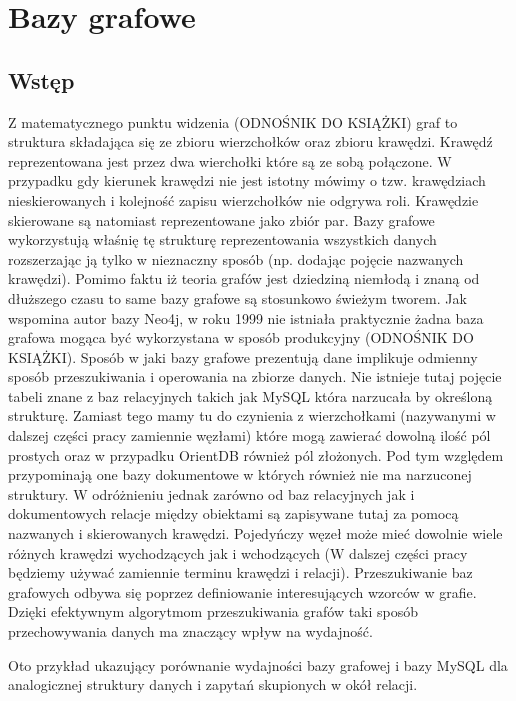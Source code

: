 \documentclass[brudnopis]{xmgr}
\begin{document}
\chapter{Bazy grafowe}

\section{Wstęp}

Z matematycznego punktu widzenia (ODNOŚNIK DO KSIĄŻKI) graf to struktura składająca się ze zbioru wierzchołków oraz zbioru krawędzi. Krawędź reprezentowana jest przez dwa wierchołki które są ze sobą połączone. W przypadku gdy kierunek krawędzi nie jest istotny mówimy o tzw. krawędziach nieskierowanych i kolejność zapisu wierzchołków nie odgrywa roli. Krawędzie skierowane są natomiast reprezentowane jako zbiór par. Bazy grafowe wykorzystują właśnię tę strukturę reprezentowania wszystkich danych rozszerzając ją tylko w nieznaczny sposób (np. dodając pojęcie nazwanych krawędzi). Pomimo faktu iż teoria grafów jest dziedziną niemłodą i znaną od dłuższego czasu to same bazy grafowe są stosunkowo świeżym tworem. Jak wspomina autor bazy Neo4j, w roku 1999 nie istniała praktycznie żadna baza grafowa mogąca być wykorzystana w sposób produkcyjny (ODNOŚNIK DO KSIĄŻKI). Sposób w jaki bazy grafowe prezentują dane implikuje odmienny sposób przeszukiwania i operowania na zbiorze danych. Nie istnieje tutaj pojęcie tabeli znane z baz relacyjnych takich jak MySQL która narzucała by określoną strukturę. Zamiast tego mamy tu do czynienia z wierzchołkami (nazywanymi w dalszej części pracy zamiennie węzłami) które mogą zawierać dowolną ilość pól prostych oraz w przypadku OrientDB również pól złożonych. Pod tym względem przypominają one bazy dokumentowe w których również nie ma narzuconej struktury. W odróżnieniu jednak zarówno od baz relacyjnych jak i dokumentowych relacje między obiektami są zapisywane tutaj za pomocą nazwanych i skierowanych krawędzi. Pojedyńczy węzeł może mieć dowolnie wiele różnych krawędzi wychodzących jak i wchodzących (W dalszej części pracy będziemy używać zamiennie terminu krawędzi i relacji). Przeszukiwanie baz grafowych odbywa się poprzez definiowanie interesujących wzorców w grafie. Dzięki efektywnym algorytmom przeszukiwania grafów taki sposób przechowywania danych ma znaczący wpływ na wydajność.

Oto przykład ukazujący porównanie wydajności bazy grafowej i bazy MySQL dla analogicznej struktury danych i zapytań skupionych w okół relacji.
\end{document}
